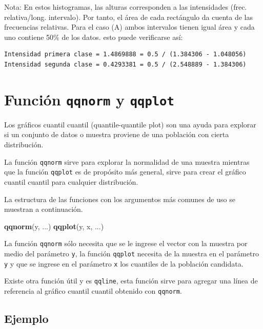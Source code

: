 \documentclass[10pt,]{krantz}
\makeatletter
\newenvironment{Shaded}{\begin{snugshade}}{\end{snugshade}}
\newcommand{\KeywordTok}[1]{\textcolor[rgb]{0.13,0.29,0.53}{\textbf{#1}}}
\newcommand{\NormalTok}[1]{#1}
\newenvironment{kframe}{%
\medskip{}
\setlength{\fboxsep}{.8em}
 \def\at@end@of@kframe{}%
 \ifinner\ifhmode%
  \def\at@end@of@kframe{\end{minipage}}%
  \begin{minipage}{\columnwidth}%
 \fi\fi%
 \def\FrameCommand##1{\hskip\@totalleftmargin \hskip-\fboxsep
 \colorbox{shadecolor}{##1}\hskip-\fboxsep
     \hskip-\linewidth \hskip-\@totalleftmargin \hskip\columnwidth}%
 \MakeFramed {\advance\hsize-\width
   \@totalleftmargin\z@ \linewidth\hsize
   \@setminipage}}%
 {\par\unskip\endMakeFramed%
 \at@end@of@kframe}
\renewenvironment{Shaded}{\begin{kframe}}{\end{kframe}}
\makeatother
\begin{document}
Nota: En estos histogramas, las alturas corresponden a las intensidades
(frec. relativa/long. intervalo). Por tanto, el área de cada rectángulo
da cuenta de las frecuencias relativas. Para el caso (A) ambos
intervalos tienen igual área y cada uno contiene 50\% de los datos. esto
puede verificarse así:

\begin{verbatim}
Intensidad primera clase = 1.4869888 = 0.5 / (1.384306 - 1.048056)
Intensidad segunda clase = 0.4293381 = 0.5 / (2.548889 - 1.384306)
\end{verbatim}

\section{\texorpdfstring{Función \texttt{qqnorm} y \texttt{qqplot}
}{Función qqnorm y qqplot  }}\label{funcion-qqnorm-y-qqplot}

Los gráficos cuantil cuantil (quantile-quantile plot) son una ayuda para
explorar si un conjunto de datos o muestra proviene de una población con
cierta distribución.

La función \texttt{qqnorm} sirve para explorar la normalidad de una
muestra mientras que la función \texttt{qqplot} es de propósito más
general, sirve para crear el gráfico cuantil cuantil para cualquier
distribución.

La estructura de las funciones con los argumentos más comunes de uso se
muestran a continuación.

\begin{Shaded}
\begin{Highlighting}[]
\KeywordTok{qqnorm}\NormalTok{(y, ...)}
\KeywordTok{qqplot}\NormalTok{(y, x, ...)}
\end{Highlighting}
\end{Shaded}

La función \texttt{qqnorm} sólo necesita que se le ingrese el vector con
la muestra por medio del parámetro \texttt{y}, la función
\texttt{qqplot} necesita de la muestra en el parámetro \texttt{y} y que
se ingrese en el parámetro \texttt{x} los cuantiles de la población
candidata.

Existe otra función útil y es \texttt{qqline}, esta función sirve para
agregar una línea de referencia al gráfico cuantil cuantil obtenido con
\texttt{qqnorm}.

\subsection*{Ejemplo}\label{ejemplo-4}
\end{document}
